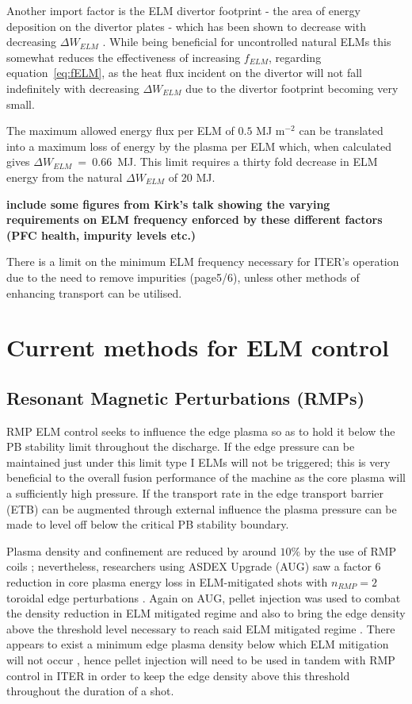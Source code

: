 \documentclass[12pt]{article}  %
\begin{document}
Another import factor is the ELM divertor footprint - the area of energy deposition on the divertor plates - which has been shown to decrease with decreasing $\Delta W_{ELM}$ \cite{Eich2011}. While being beneficial for uncontrolled natural ELMs this somewhat reduces the effectiveness of increasing $f_{ELM}$, regarding equation~\ref{eq:fELM}, as the heat flux incident on the divertor will not fall indefinitely with decreasing $\Delta W_{ELM}$ due to the divertor footprint becoming very small.

The maximum allowed energy flux per ELM of $0.5$ MJ m$^{-2}$ can be translated into a maximum loss of energy by the plasma per ELM which, when calculated gives $\Delta W_{ELM}~=~0.66$~MJ\cite{Loarte2010conf}. This limit requires a thirty fold decrease in ELM energy from the natural $\Delta W_{ELM}$ of 20 MJ. 

\textbf{include some figures from Kirk's talk showing the varying requirements on ELM frequency enforced by these different factors (PFC health, impurity levels etc.)}

There is a limit on the minimum ELM frequency necessary for ITER's operation due to the need to remove impurities (page5/6)\cite{Loarte2014a}, unless other methods of enhancing transport can be utilised.

\section{Current methods for ELM control}\label{sec:Control}

\subsection{Resonant Magnetic Perturbations (RMPs)}\label{ssec:RMP}
RMP ELM control seeks to influence the edge plasma so as to hold it below the PB stability limit throughout the discharge. If the edge pressure can be maintained just under this limit type I ELMs will not be triggered; this is very beneficial to the overall fusion performance of the machine as the core plasma will a sufficiently high pressure. If the transport rate in the edge transport barrier (ETB) can be augmented through external influence the plasma pressure can be made to level off below the critical PB stability boundary. 

Plasma density and confinement are reduced by around $10\%$ by the use of RMP coils \cite{Lang2013}; nevertheless, researchers using ASDEX Upgrade (AUG) saw a factor 6 reduction in core plasma energy loss in ELM-mitigated shots with $n_{RMP}=2$ toroidal edge perturbations \cite{Suttrop2011}. Again on AUG, pellet injection was used to combat the density reduction in ELM mitigated regime and also to bring the edge density above the threshold level necessary to reach said ELM mitigated regime \cite{Lang2012}. There appears to exist a minimum edge plasma density below which ELM mitigation will not occur \cite{Suttrop2011}, hence pellet injection will need to be used in tandem with RMP control in ITER in order to keep the edge density above this threshold throughout the duration of a shot.
\end{document}
